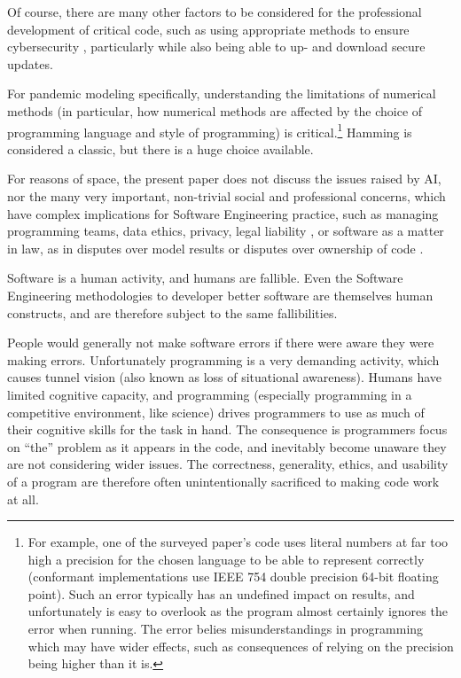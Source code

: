 \documentclass[10pt,a4paper]{article}
\begin{document}
Of course, there are many other factors to be considered for the professional development of critical code, such as using appropriate methods to ensure cybersecurity \cite{security-engineering,cyber-cacm}, particularly while also being able to up- and download secure updates.

For pandemic modeling specifically, understanding the limitations of numerical methods (in particular, how numerical methods are affected by the choice of programming language and style of programming) is critical.\footnote{{For example, one of the surveyed paper's code \cite{example-numerical-error} uses literal numbers at far too high a precision for the chosen language to be able to represent correctly (conformant implementations use IEEE 754 double precision 64-bit floating point). Such an error typically has an undefined impact on results, and unfortunately is easy to overlook as the program almost certainly ignores the error when running. The error belies misunderstandings in programming which may have wider effects, such as consequences of relying on the precision being higher than it is.}} Hamming \cite{hamming} is considered a classic, but there is a huge choice available.

{For reasons of space, the present paper does not discuss the issues raised by AI, nor the many very important, non-trivial social and professional concerns, which have complex implications for Software Engineering practice, such as managing programming teams, data ethics, privacy, legal liability \cite{Schneier}, or software as a matter in law, as in disputes over model results or disputes over ownership of code \cite{electronic-evidence}.}


Software is a human activity, and humans are fallible. Even the Software Engineering methodologies to developer better software are themselves human constructs, and are therefore subject to the same fallibilities.

People would generally not make software errors if there were aware they were making errors. Unfortunately programming is a very demanding activity, which causes tunnel vision (also known as loss of situational awareness). Humans have limited cognitive capacity, and programming (especially programming in a competitive environment, like science) drives programmers to use as much of their cognitive skills for the task in hand. The consequence is programmers focus on ``the'' problem as it appears in the code, and inevitably become unaware they are not considering wider issues. The correctness, generality, ethics, and usability of a program are therefore often unintentionally sacrificed to making code work at all. 
\end{document}
